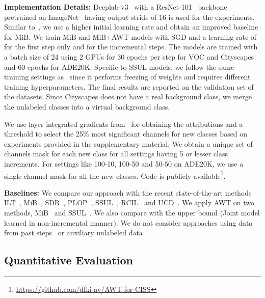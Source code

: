 \noindent\textbf{Implementation Details:}
Deeplab-v3~\cite{chen2017rethinking} with a ResNet-101~\cite{he2016deep} backbone pretrained on ImageNet~\cite{deng2009imagenet} having output stride of 16 is used for the experiments. Similar to~\cite{zhang2022representation}, we use a higher initial learning rate and obtain an improved baseline for MiB. We train MiB and MiB+AWT models with SGD and a learning rate of  for the first step only and  for the incremental steps. The models are trained with a batch size of 24 using 2 GPUs for 30 epochs per step for VOC and Cityscapes and 60 epochs for ADE20K. Specific to SSUL models, we follow the same training settings as~\cite{cha2021ssul} since it performs freezing of weights and requires different training hyperparameters. The final results are reported on the validation set of the datasets. Since Cityscapes does not have a real background class, we merge the unlabeled classes into a virtual background class.

We use layer integrated gradients from~\cite{kokhlikyan2020captum} for obtaining the attributions and a threshold  to select the 25\% most significant channels for new classes based on experiments provided in the supplementary material. We obtain a unique set of channels mask for each new class for all settings having 5 or lesser class increments. For settings like 100-10, 100-50 and 50-50 on ADE20K, we use a single channel mask for all the new classes. Code is publicly available\footnote{\url{https://github.com/dfki-av/AWT-for-CISS}}.


\noindent\textbf{Baselines:} We compare our approach with the recent state-of-the-art methods ILT~\cite{michieli2019incremental}, MiB~\cite{cermelli2020modeling}, SDR~\cite{michieli2021continual}, PLOP~\cite{douillard2021plop}, SSUL~\cite{cha2021ssul}, RCIL~\cite{zhang2022representation} and UCD~\cite{yang2022uncertainty}. We apply AWT on two methods, MiB~\cite{cermelli2020modeling} and SSUL~\cite{cha2021ssul}.
We also compare with the upper bound (Joint model learned in non-incremental manner). We do not consider approaches using data from past steps~\cite{maracani2021recall} or auxiliary unlabeled data~\cite{yu2022self}.



\subsection{Quantitative Evaluation}

